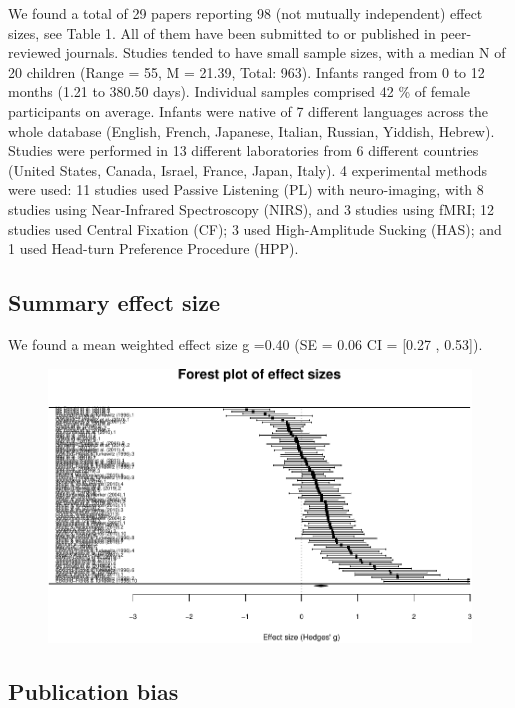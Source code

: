 \documentclass[man]{apa6}
\begin{document}
We found a total of 29 papers reporting 98 (not mutually independent)
effect sizes, see Table 1. All of them have been submitted to or
published in peer-reviewed journals. Studies tended to have small sample
sizes, with a median N of 20 children (Range = 55, M = 21.39, Total:
963). Infants ranged from 0 to 12 months (1.21 to 380.50 days).
Individual samples comprised 42 \% of female participants on average.
Infants were native of 7 different languages across the whole database
(English, French, Japanese, Italian, Russian, Yiddish, Hebrew). Studies
were performed in 13 different laboratories from 6 different countries
(United States, Canada, Israel, France, Japan, Italy). 4 experimental
methods were used: 11 studies used Passive Listening (PL) with
neuro-imaging, with 8 studies using Near-Infrared Spectroscopy (NIRS),
and 3 studies using fMRI; 12 studies used Central Fixation (CF); 3 used
High-Amplitude Sucking (HAS); and 1 used Head-turn Preference Procedure
(HPP).

\subsection{Summary effect size}\label{summary-effect-size}

We found a mean weighted effect size g =0.40 (SE = 0.06 CI = {[}0.27 ,
0.53{]}).

\begin{figure}
\centering
\includegraphics{MA_speech_pref_files/figure-latex/forest plot-1.pdf}
\caption{}
\end{figure}

\subsection{Publication bias}\label{publication-bias}
\end{document}
